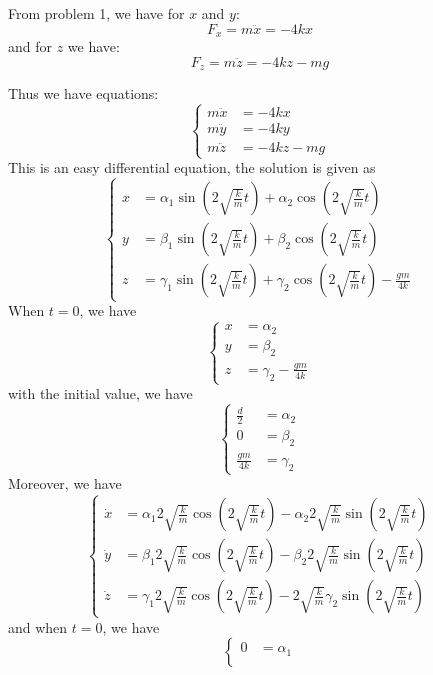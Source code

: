 \documentclass{article}
\begin{document}
\begin{enumerate}
    From problem 1, we have for $x$ and $y$:
    \[
    F_x = m\ddot{x} = -4kx
    \]
    and for $z$ we have:
    \[
    F_z = m\ddot{z} = -4kz - mg
    \]

    Thus we have equations:
    \[
    \left\{
    \begin{aligned}
    m\ddot{x} &= -4kx \\
    m\ddot{y} &= -4ky \\
    m\ddot{z} &= -4kz - mg
    \end{aligned}
    \right. 
    \] 
    This is an easy differential equation, the solution is given as
    \[
    \left\{
    \begin{aligned}
    x &= \alpha_1 \sin(2\sqrt{\frac{k}{m}}t) + \alpha_2 \cos(2\sqrt{\frac{k}{m}}t)\\
    y &= \beta_1 \sin(2\sqrt{\frac{k}{m}}t) + \beta_2 \cos(2\sqrt{\frac{k}{m}}t)\\
    z &= \gamma_1 \sin(2\sqrt{\frac{k}{m}}t) + \gamma_2 \cos(2\sqrt{\frac{k}{m}}t) - \frac{gm}{4k}
    \end{aligned}
    \right. 
    \] 
    When $t = 0$, we have
    \[
    \left\{
    \begin{aligned}
    x &= \alpha_2\\
    y &= \beta_2\\
    z &= \gamma_2 - \frac{gm}{4k}
    \end{aligned}
    \right. 
    \] 
    with the initial value, we have
    \[
    \left\{
    \begin{aligned}
    \frac{d}{2} &= \alpha_2\\
    0 &= \beta_2\\
    \frac{gm}{4k} &= \gamma_2 
    \end{aligned}
    \right. 
    \] 
    Moreover, we have
    \[
    \left\{
    \begin{aligned}
    \dot{x} &= \alpha_1 2\sqrt{\frac{k}{m}}\cos(2\sqrt{\frac{k}{m}}t) - \alpha_2 2\sqrt{\frac{k}{m}}\sin(2\sqrt{\frac{k}{m}}t)\\
    \dot{y} &= \beta_1 2\sqrt{\frac{k}{m}}\cos(2\sqrt{\frac{k}{m}}t) - \beta_2 2\sqrt{\frac{k}{m}}\sin(2\sqrt{\frac{k}{m}}t)\\
    \dot{z} &= \gamma_1 2\sqrt{\frac{k}{m}}\cos(2\sqrt{\frac{k}{m}}t) - 2\sqrt{\frac{k}{m}}\gamma_2 \sin(2\sqrt{\frac{k}{m}}t)
    \end{aligned}
    \right. 
    \] 
    and when $t= 0$, we have
    \[
    \left\{
    \begin{aligned}
    0 &= \alpha_1 \\

\end{aligned}\]
\end{enumerate}
\end{document}
